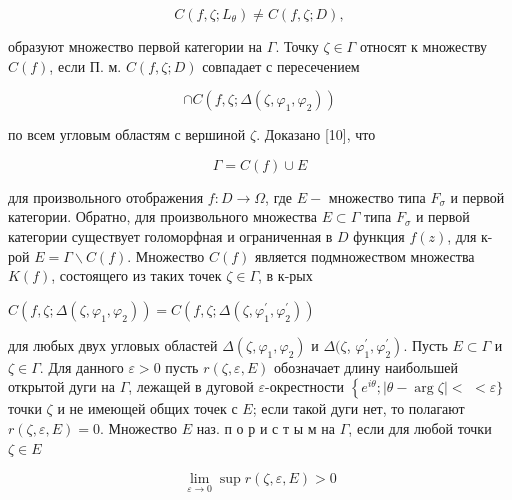 \documentclass[10pt]{article}
\begin{document}
\[

C\left(f, \zeta ; L_{\theta}\right) \neq C(f, \zeta ; D),

\]



образуют множество первой категории на $\Gamma$. Точку $\zeta \in \Gamma$ относят к множеству $C(f)$, если П. м. $C(f, \zeta ; D)$ совпадает с пересечением



\[

\cap C\left(f, \zeta ; \Delta\left(\zeta, \varphi_{1}, \varphi_{2}\right)\right)

\]



по всем угловым областям с вершиной $\zeta$. Доказано [10], что



\[

\Gamma=C(f) \cup E

\]



для произвольного отображения $f: D \rightarrow \Omega$, где $E-$ множество типа $F_{\sigma}$ и первой категории. Обратно, для произвольного множества $E \subset \Gamma$ типа $F_{\sigma}$ и первой категории существует голоморфная и ограниченная в $D$ функция $f(z)$, для к-рой $E=\Gamma \backslash C(f)$. Множество $C(f)$ является подмножеством множества $K(f)$, состоящего из таких точек $\zeta \in \Gamma$, в к-рых



$C\left(f, \zeta ; \Delta\left(\zeta, \varphi_{1}, \varphi_{2}\right)\right)=C\left(f, \zeta ; \Delta\left(\zeta, \varphi_{1}^{\prime}, \varphi_{2}^{\prime}\right)\right)$



для любых двух угловых областей $\Delta\left(\zeta, \varphi_{1}, \varphi_{2}\right)$ и $\Delta(\zeta$, $\left.\varphi_{1}^{\prime}, \varphi_{2}^{\prime}\right)$. Пусть $E \subset \Gamma$ и $\zeta \in \Gamma$. Для данного $\varepsilon>0$ пусть $r(\zeta, \varepsilon, E)$ обозначает длину наибольшей открытой дуги на $\Gamma$, лежащей в дуговой $\varepsilon$-окрестности $\left\{e^{i \theta} ;|\theta-\arg \zeta|<\right.$ $<\varepsilon\}$ точки $\zeta$ и не имеющей общих точек с $E$; если такой дуги нет, то полагают $r(\zeta, \varepsilon, E)=0$. Множество $E$ наз. п о р и с т ы м на $\Gamma$, если для любой точки $\zeta \in E$



\[

\lim _{\varepsilon \rightarrow 0} \sup r(\zeta, \varepsilon, E)>0

\]
\end{document}
